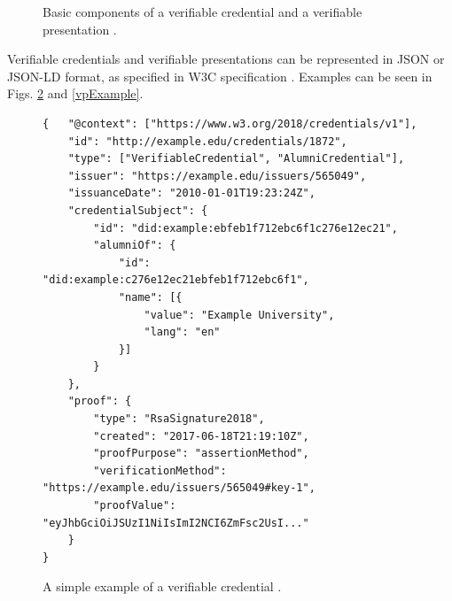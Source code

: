 \begin{figure}[h!]
    \centering
     
    \hfil
    
    \caption{Basic components of a verifiable credential and a verifiable presentation \cite{vcW3C}.}
    \label{vc-vp-topview}
\end{figure}

Verifiable credentials and verifiable presentations can be represented in JSON \cite{json-rfc3986} or JSON-LD \cite{json-ld} format, as specified in W3C specification \cite{vcW3C}. Examples can be seen in Figs. \ref{vcExample} and \ref{vpExample}. \\

\begin{figure}[h!]
\begin{lstlisting}[style=json, breaklines=true,frame=single]
{   "@context": ["https://www.w3.org/2018/credentials/v1"],
    "id": "http://example.edu/credentials/1872",
    "type": ["VerifiableCredential", "AlumniCredential"],
    "issuer": "https://example.edu/issuers/565049",
    "issuanceDate": "2010-01-01T19:23:24Z",
    "credentialSubject": {
        "id": "did:example:ebfeb1f712ebc6f1c276e12ec21",
        "alumniOf": {
            "id": "did:example:c276e12ec21ebfeb1f712ebc6f1",
            "name": [{
                "value": "Example University",
                "lang": "en"
            }]
        }
    },    
    "proof": {
        "type": "RsaSignature2018",
        "created": "2017-06-18T21:19:10Z",
        "proofPurpose": "assertionMethod",
        "verificationMethod": "https://example.edu/issuers/565049#key-1",
        "proofValue": "eyJhbGciOiJSUzI1NiIsImI2NCI6ZmFsc2UsI..."
    }
}
\end{lstlisting}
\caption{A simple example of a verifiable credential \cite{vcW3C}. \label{vcExample}}
\end{figure}



